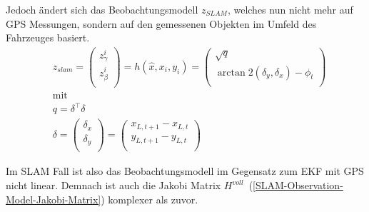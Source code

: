 \documentclass[11pt]{article}
\begin{document}
Jedoch ändert sich das Beobachtungsmodell $z_{SLAM}$, welches nun nicht mehr auf GPS Messungen, sondern auf den gemessenen Objekten im Umfeld des Fahrzeuges basiert.
\begin{equation}\label{SLAM-Observation-Model}
\begin{split}
	&z_{slam} = \begin{pmatrix}
		z_\gamma^i \\
		z_\beta^i \\
	\end{pmatrix} = h(\hat{x}, x_i, y_i) = \begin{pmatrix}
		\sqrt{q} \\
		\arctan 2(\delta_y, \delta_x) - \phi_t \\
	\end{pmatrix}\\
	&\text{mit} \\
	&q = \delta^\intercal \delta \\
	&\delta = \begin{pmatrix}
		\delta_x \\
		\delta_y \\
	\end{pmatrix} = \begin{pmatrix}
		x_{L, t+1} - x_{L, t}  \\
		y_{L, t+1}  - y_{L, t} \\
	\end{pmatrix}
\end{split}
\end{equation}

Im SLAM Fall ist also das Beobachtungsmodell im Gegensatz zum EKF mit GPS nicht linear. Demnach ist auch die Jakobi Matrix $H^{voll}$~(\ref{SLAM-Observation-Model-Jakobi-Matrix}) komplexer als zuvor.
\end{document}
